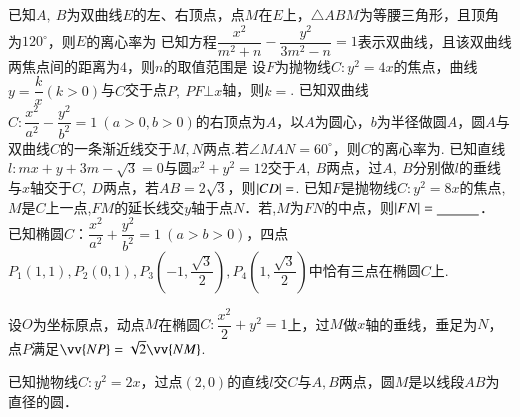 \documentclass{BHCexam}
\begin{document}
\begin{questions}
	\qs 已知$ A,~B $为双曲线$ E $的左、右顶点，点$ M $在$ E $上，$ \triangle ABM $为等腰三角形，且顶角为$ 120^{\circ} $，则$ E $的离心率为\xx
	\qs 已知方程$ \dfrac{x^2}{m^2+n} -\dfrac{y^2}{3m^2-n}=1$表示双曲线，且该双曲线两焦点间的距离为$ 4 $，则$ n $的取值范围是\xx
\qs 设$ F $为抛物线$ C:y^2=4x $的焦点，曲线$ y=\dfrac{k}{x}\left(k>0\right) $与$ C $交于点$ P ,~PF\bot x$轴，则$ k= $\tk.
	\qs 已知双曲线$C:\dfrac{x^2}{a^2}-\dfrac{y^2}{b^2}=1~(a>0,b>0)$的右顶点为$A$，以$A$为圆心，$b$为半径做圆$A$，圆$A$与双曲线$C$的一条渐近线交于$M,N$两点.若$\angle MAN=60^{\circ}$，则$C$的离心率为\tk.
	\qs 已知直线$ l:mx+y+3m-\sqrt{3}=0 $与圆$ x^2+y^2=12 $交于$ A,~B $两点，过$ A,~B $分别做$ l $的垂线与$ x $轴交于$ C,~D $两点，若$ AB=2\sqrt{3} $，则$ \left|CD\right| =$\tk.
	\qs 已知$ F $是抛物线$ C:y^2=8x $的焦点,$ M $是$ C $上一点,$ FM $的延长线交$ y $轴于点$ N $．若,$ M $为$ FN $的中点，则$\left|FN\right|=\underline{\hspace{3em}}$．
	\qs 已知椭圆$C$：$\dfrac{x^2}{a^2}+\dfrac{y^2}{b^2}=1~(a>b>0)$，四点$ P_1(1,1),P_2(0,1),P_3\left(-1,\dfrac{\sqrt{3}}{2}\right) ,P_4\left(1,\dfrac{\sqrt{3}}{2}\right)$中恰有三点在椭圆$ C $上.
\qs 设$O$为坐标原点，动点$M$在椭圆$C:\dfrac{x^2}{2}+y^2=1$上，过$M$做$x$轴的垂线，垂足为$N$，点$P$满足$ \vv{NP}=\sqrt{2}\vv{NM} $.
\qs 已知抛物线$C:y^2=2x$，过点$(2,0)$的直线$l$交$C$与$A,B$两点，圆$M$是以线段$AB$为直径的圆．
\begin{parts}

\end{parts}
\end{questions}
\end{document}
